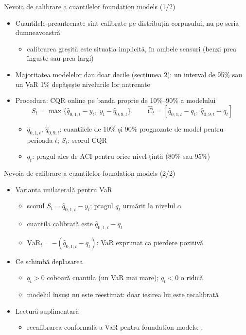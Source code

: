 \begin{frame}{Nevoia de calibrare a cuantilelor foundation models (1/2)}
\itemsize{\small}
\begin{itemize}
    \item Cuantilele preantrenate sînt calibrate pe distribuția corpusului, nu pe seria dumneavoastră
    \begin{itemize}
        \item calibrarea greșită este situația implicită, în ambele sensuri (benzi prea înguste sau prea largi)
    \end{itemize}
    \item Majoritatea modelelor dau doar decile (secțiunea 2): un interval de 95\% sau un VaR 1\% depășește nivelurile lor antrenate
    \item Procedura: CQR online pe banda proprie de 10\%--90\% a modelului \[ S_t = \max\{\hat q_{0{,}1,t} - y_t,\; y_t - \hat q_{0{,}9,t}\}, \qquad \hat C_t = [\hat q_{0{,}1,t} - q_t,\; \hat q_{0{,}9,t} + q_t] \]
    \begin{itemize}
        \item $\hat q_{0{,}1,t}$, $\hat q_{0{,}9,t}$: cuantilele de 10\% și 90\% prognozate de model pentru perioada $t$; $S_t$: scorul CQR
        \item $q_t$: pragul ales de ACI pentru orice nivel-țintă (80\% sau 95\%)
    \end{itemize}
\end{itemize}
\end{frame}

\begin{frame}{Nevoia de calibrare a cuantilelor foundation models (2/2)}
\itemsize{\small}
\begin{itemize}
    \item Varianta unilaterală pentru VaR
    \begin{itemize}
        \item scorul $S_t = \hat q_{0{,}1,t} - y_t$; pragul $q_t$ urmărit la nivelul $\alpha$
        \item cuantila calibrată este $\hat q_{0{,}1,t} - q_t$
        \item $\mathrm{VaR}_t = -(\hat q_{0{,}1,t} - q_t)$: VaR exprimat ca pierdere pozitivă
    \end{itemize}
    \item Ce schimbă deplasarea
    \begin{itemize}
        \item $q_t > 0$ coboară cuantila (un VaR mai mare); $q_t < 0$ o ridică
        \item modelul însuși nu este reestimat: doar ieșirea lui este recalibrată
    \end{itemize}
    \item Lectură suplimentară
    \begin{itemize}
        \item recalibrarea conformală a VaR pentru foundation models: ; 
    \end{itemize}
\end{itemize}
\end{frame}

